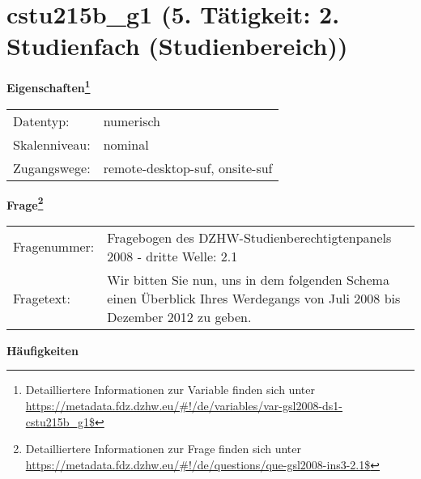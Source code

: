 
    \setcounter{footnote}{0}

    \vspace*{-1.8cm}
	\section{cstu215b\_g1 (5. Tätigkeit: 2. Studienfach (Studienbereich))}
	\label{section:cstu215b_g1}



    \vspace*{0.5cm}
    \noindent\textbf{Eigenschaften\footnote{Detailliertere Informationen zur Variable finden sich unter
		\url{https://metadata.fdz.dzhw.eu/\#!/de/variables/var-gsl2008-ds1-cstu215b_g1$}}}\\
	\begin{tabularx}{\hsize}{@{}lX}
	Datentyp: & numerisch \\
	Skalenniveau: & nominal \\
	Zugangswege: &
	  remote-desktop-suf, 
	  onsite-suf
 \\
    \end{tabularx}



				\vspace*{0.5cm}
                \noindent\textbf{Frage\footnote{Detailliertere Informationen zur Frage finden sich unter
		              \url{https://metadata.fdz.dzhw.eu/\#!/de/questions/que-gsl2008-ins3-2.1$}}}\\
				\begin{tabularx}{\hsize}{@{}lX}
					Fragenummer: &
					  Fragebogen des DZHW-Studienberechtigtenpanels 2008 - dritte Welle:
					  2.1
 \\
					Fragetext: & Wir bitten Sie nun, uns in dem folgenden Schema einen Überblick Ihres Werdegangs von Juli 2008 bis Dezember 2012 zu geben. \\
				\end{tabularx}





        		\vspace*{0.5cm}
                \noindent\textbf{Häufigkeiten}

